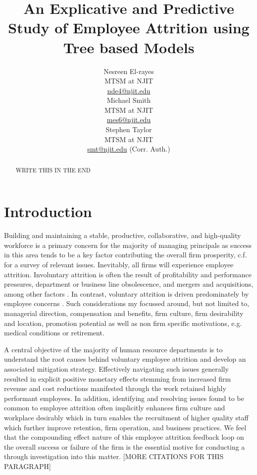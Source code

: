 \documentclass[10pt]{article}
\title{An Explicative and Predictive Study of Employee Attrition using Tree based Models}
\author{Nesreen El-rayes\\
  MTSM at NJIT \\
  {\underline{nde4@njit.edu}} \\\And
  Michael Smith\\
  MTSM at NJIT \\
  {\underline{mes6@njit.edu}}\\\And 
  Stephen Taylor\\
  MTSM at NJIT \\
  {\underline{smt@njit.edu} (Corr. Auth.)} \\}
\date{}
\begin{document}
\maketitle
\begin{abstract}
WRITE THIS IN THE END
\end{abstract}

\section{Introduction}
Building and maintaining a stable, productive, collaborative, and high-quality workforce is a primary concern 
for the majority of managing principals as success in this area tends to be a key factor contributing the 
overall firm prosperity, c.f. \cite{Mir1993} for a survey of relevant issues.
Inevitably, all firms will experience employee attrition.  
Involuntary attrition is often the result of profitability and performance pressures, department or business 
line obsolescence, and mergers and acquisitions, among other factors \cite{Datta2009,Grip2006,SHAU1998}.  In contrast,
voluntary attrition is driven predominately by employee concerns \cite{Singh2012}.  Such considerations 
my focussed around, but not limited to, managerial direction, compensation and benefits, firm culture, 
firm desirability and location, promotion potential as well as non firm specific motivations, e.g. medical 
conditions or retirement. 
  
A central objective of the majority of human resource departments is to understand the root causes 
behind voluntary employee attrition and develop an associated mitigation strategy.  Effectively 
navigating such issues generally resulted in explicit positive monetary effects stemming from increased 
firm revenue and cost reductions manifested through the work retained highly performant employees. 
In addition, identifying and resolving issues found to be common to employee attrition often implicitly 
enhances firm culture and workplace desirably which in turn enables the recruitment of higher quality 
staff which further improve retention, firm operation, and business practices.  
We feel that the compounding effect nature of 
this employee attrition feedback loop on the overall success or failure of the firm is the essential motive 
for conducting a through investigation into this matter. [MORE CITATIONS FOR THIS PARAGRAPH]  
\end{document}
